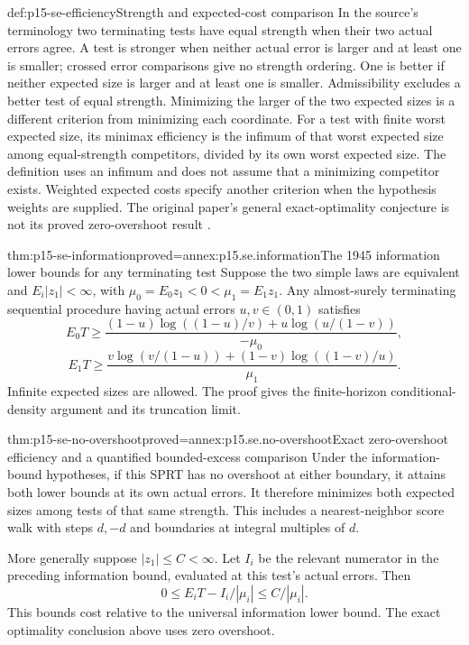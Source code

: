 \begin{hbdefinition}{def:p15-se-efficiency}{Strength and expected-cost comparison}
In the source's terminology two terminating tests have equal strength
when their two actual errors agree. A test is stronger when neither
actual error is larger and at least one is smaller; crossed error
comparisons give no strength ordering. One is better if neither expected
size is larger and at least one is smaller. Admissibility excludes a
better test of equal strength. Minimizing the larger of the two expected
sizes is a different criterion from minimizing each coordinate.
For a test with finite worst expected size, its minimax efficiency is
the infimum of that worst expected size among equal-strength competitors,
divided by its own worst expected size. The definition uses an infimum
and does not assume that a minimizing competitor exists. Weighted
expected costs specify another criterion when the hypothesis weights
are supplied.
The original paper's general exact-optimality conjecture is not its
proved zero-overshoot result \cite[Sections 2.2 and 4.7]{Wald1945SequentialTests}.
\end{hbdefinition}

\begin{hbtheorem}{thm:p15-se-information}{proved=annex:p15.se.information}{The 1945 information lower bounds for any terminating test}
Suppose the two simple laws are equivalent and
\(E_i|z_1|<\infty\), with \(\mu_0=E_0z_1<0<\mu_1=E_1z_1\).
Any almost-surely terminating sequential procedure having actual errors
\(u,v\in(0,1)\) satisfies
\[
 E_0T\geq
 \frac{(1-u)\log((1-u)/v)+u\log(u/(1-v))}{-\mu_0},
\]
\[
 E_1T\geq
 \frac{v\log(v/(1-u))+(1-v)\log((1-v)/u)}{\mu_1}.
\]
Infinite expected sizes are allowed. The proof gives the finite-horizon
conditional-density argument and its truncation limit.
\cite[Section 4.7, equations (4.80)--(4.89)]{Wald1945SequentialTests}
\end{hbtheorem}

\begin{hbtheorem}{thm:p15-se-no-overshoot}{proved=annex:p15.se.no-overshoot}{Exact zero-overshoot efficiency and a quantified bounded-excess comparison}
Under the information-bound hypotheses, if this SPRT has no overshoot
at either boundary, it attains both lower bounds at its own actual
errors. It therefore minimizes both expected sizes among tests of
that same strength. This includes a nearest-neighbor score walk with
steps \(d,-d\) and boundaries at integral multiples of \(d\).

More generally suppose \(|z_1|\leq C<\infty\). Let \(I_i\) be
the relevant numerator in the preceding information bound, evaluated at
this test's actual errors. Then
\[
          0\leq E_iT-I_i/|\mu_i|\leq C/|\mu_i|.
\]
This bounds cost relative to the universal information lower bound.
The exact optimality conclusion above uses zero overshoot.
\end{hbtheorem}


